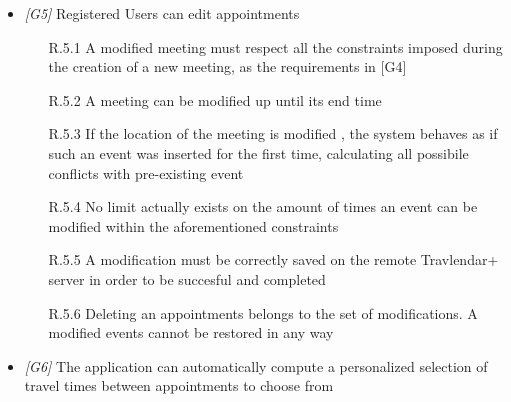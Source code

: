 \begin{itemize}
\begin{itemize}
                  \end{itemize}
                  
\item \textit{[G5]} Registered Users can edit appointments

                  \begin{itemize}
                       \item  [R.5.1] A modified meeting must respect all the constraints imposed during the creation of a new meeting, as the requirements in [G4]
                       \item [R.5.2] A meeting can be modified up until its end time
                       \item [R.5.3] If the location of the meeting is modified , the system behaves as if such an event was inserted for the first time, calculating all possibile conflicts with pre-existing event
                       \item [R.5.4] No limit actually exists on the amount of times an event can be modified within the aforementioned constraints 
                       \item [R.5.5] A modification must be correctly saved on the remote Travlendar+ server in order to be succesful and completed              
                       \item [R.5.6] Deleting an appointments belongs to the set of modifications. A modified events cannot be restored in any way

                 \end{itemize}

\item \textit{[G6]} The application can automatically compute a personalized selection of travel times between appointments to choose from


\end{itemize}
